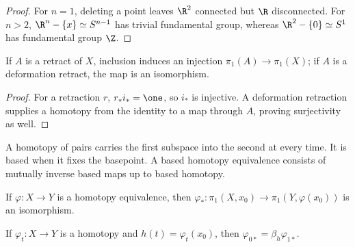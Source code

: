 \begin{proof}
\leanok
\sketch For $n=1$, deleting a point leaves $\R^2$ connected but $\R$ disconnected.
For $n>2$, $\R^n-\{x\}\simeq S^{n-1}$ has trivial fundamental group,
whereas $\R^2-\{0\}\simeq S^1$ has fundamental group $\Z$.
\end{proof}

\begin{proposition}
\label{prop:retract-induces-injective-pi1}
\leanok
{}
If $A$ is a retract of $X$, inclusion induces an injection $\pi_1(A)\to\pi_1(X)$;
if $A$ is a deformation retract, the map is an isomorphism.
\end{proposition}

\begin{proof}
\leanok
\sketch For a retraction $r$, $r_*i_*=\one$, so $i_*$ is injective. A deformation
retraction supplies a homotopy from the identity to a map through $A$, proving
surjectivity as well.
\end{proof}

\begin{definition}
\label{def:based-homotopy-equivalence}
\leanok
{}
A homotopy of pairs carries the first subspace into the second at every time.
It is based when it fixes the basepoint. A based homotopy equivalence consists
of mutually inverse based maps up to based homotopy.
\end{definition}

\begin{proposition}
\label{prop:homotopy-equivalence-induces-pi1-iso}
\leanok
{}
If $\varphi:X\to Y$ is a homotopy equivalence, then
$\varphi_*:\pi_1(X,x_0)\to\pi_1(Y,\varphi(x_0))$ is an isomorphism.
\end{proposition}

\begin{lemma}
\label{lem:basepoint-change-homotopy}
\leanok
{}
If $\varphi_t:X\to Y$ is a homotopy and $h(t)=\varphi_t(x_0)$, then
$\varphi_{0*}=\beta_h\varphi_{1*}$.
\end{lemma}

